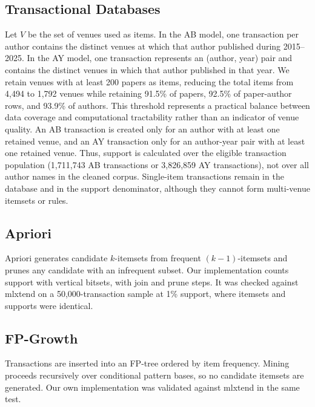 \documentclass[conference]{IEEEtran}
\begin{document}
\subsection{Transactional Databases}
Let $V$ be the set of venues used as items. In the AB model, one transaction per author contains the distinct venues at which that author published during 2015--2025. In the AY model, one transaction represents an (author, year) pair and contains the distinct venues in which that author published in that year. We retain venues with at least 200 papers as items, reducing the total items from 4,494 to 1,792 venues while retaining 91.5\% of papers, 92.5\% of paper-author rows, and 93.9\% of authors. This threshold represents a practical balance between data coverage and computational tractability rather than an indicator of venue quality. An AB transaction is created only for an author with at least one retained venue, and an AY transaction only for an author-year pair with at least one retained venue. Thus, support is calculated over the eligible transaction population (1,711,743 AB transactions or 3,826,859 AY transactions), not over all author names in the cleaned corpus. Single-item transactions remain in the database and in the support denominator, although they cannot form multi-venue itemsets or rules.

\subsection{Apriori}
Apriori generates candidate $k$-itemsets from frequent $(k-1)$-itemsets and prunes any candidate with an infrequent subset. Our implementation counts support with vertical bitsets, with join and prune steps. It was checked against mlxtend on a 50,000-transaction sample at 1\% support, where itemsets and supports were identical.

\subsection{FP-Growth}
Transactions are inserted into an FP-tree ordered by item frequency. Mining proceeds recursively over conditional pattern bases, so no candidate itemsets are generated. Our own implementation was validated against mlxtend in the same test.
\end{document}
